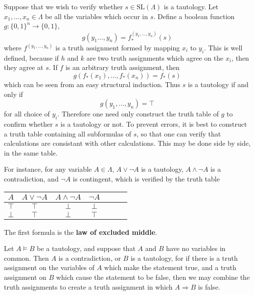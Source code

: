 Suppose that we wish to verify whether $s \in \text{SL}(\Lambda)$ is a tautology. Let $x_1, \dots, x_n \in \Lambda$ be all the variables which occur in $s$. Define a boolean function $g: \{ 0, 1 \}^n \to \{ 0, 1 \}$,
%
\[ g(y_1 \dots, y_n) = f^{(y_1, \dots, y_n)}_*(s) \]
%
where $f^{(y_1, \dots, y_n)}$ is a truth assignment formed by mapping $x_i$ to $y_i$. This is well defined, because if $h$ and $k$ are two truth assignments which agree on the $x_i$, then they agree at $s$. If $f$ is an arbitrary truth assignment, then
%
\[ g(f_*(x_1), \dots, f_*(x_n)) = f_*(s) \]
%
which can be seen from an easy structural induction. Thus $s$ is a tautology if and only if
%
\[ g(y_1, \dots, y_n) = \top \]
%
for all choice of $y_i$. Therefore one need only construct the truth table of $g$ to confirm whether $s$ is a tautology or not. To prevent errors, it is best to construct a truth table containing all subformulas of $s$, so that one can verify that calculations are consistant with other calculations. This may be done side by side, in the same table.

\begin{example}
    For instance, for any variable $A \in \Lambda$, $A \vee \neg A$ is a tautology, $A \wedge \neg A$ is a contradiction, and $\neg A$ is contingent, which is verified by the truth table
    \begin{center}
    \begin{tabular}{| c | c | c | c | c | c | c |}
        \hline $A$ & $A \vee \neg A$ & $A \wedge \neg A$ & $\neg A$ \\
        \hline $\top$ & $\top$ & $\bot$ & $\bot$ \\
               $\bot$ & $\top$ & $\bot$ & $\top$ \\
        \hline
    \end{tabular}
    \end{center}
    The first formula is the {\bf law of excluded middle}.
\end{example}

\begin{example}
    Let $A \vDash B$ be a tautology, and suppose that $A$ and $B$ have no variables in common. Then $A$ is a contradiction, or $B$ is a tautology, for if there is a truth assignment on the variables of $A$ which make the statement true, and a truth assignment on $B$ which cause the statement to be false, then we may combine the truth assignments to create a truth assignment in which $A \Rightarrow B$ is false.
\end{example}

